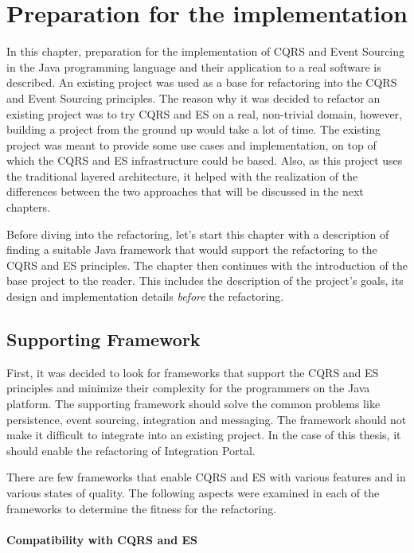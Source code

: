 \documentclass{book}
\begin{document}
\section{Preparation for the
implementation}\label{preparation-for-the-implementation}

In this chapter, preparation for the implementation of CQRS and Event
Sourcing in the Java programming language and their application to a
real software is described. An existing project was used as a base for
refactoring into the CQRS and Event Sourcing principles. The reason why
it was decided to refactor an existing project was to try CQRS and ES on
a real, non-trivial domain, however, building a project from the ground
up would take a lot of time. The existing project was meant to provide
some use cases and implementation, on top of which the CQRS and ES
infrastructure could be based. Also, as this project uses the
traditional layered architecture, it helped with the realization of the
differences between the two approaches that will be discussed in the
next chapters.

Before diving into the refactoring, let's start this chapter with a
description of finding a suitable Java framework that would support the
refactoring to the CQRS and ES principles. The chapter then continues
with the introduction of the base project to the reader. This includes
the description of the project's goals, its design and implementation
details \emph{before} the refactoring.


\subsection{Supporting Framework}\label{supporting-framework}

First, it was decided to look for frameworks that support the CQRS and
ES principles and minimize their complexity for the programmers on the
Java platform. The supporting framework should solve the common problems
like persistence, event sourcing, integration and messaging. The
framework should not make it difficult to integrate into an existing
project. In the case of this thesis, it should enable the refactoring of
Integration Portal.

There are few frameworks that enable CQRS and ES with various features
and in various states of quality. The following aspects were examined in
each of the frameworks to determine the fitness for the refactoring.

\paragraph{Compatibility with CQRS and
ES}\label{compatibility-with-cqrs-and-es}
\end{document}
